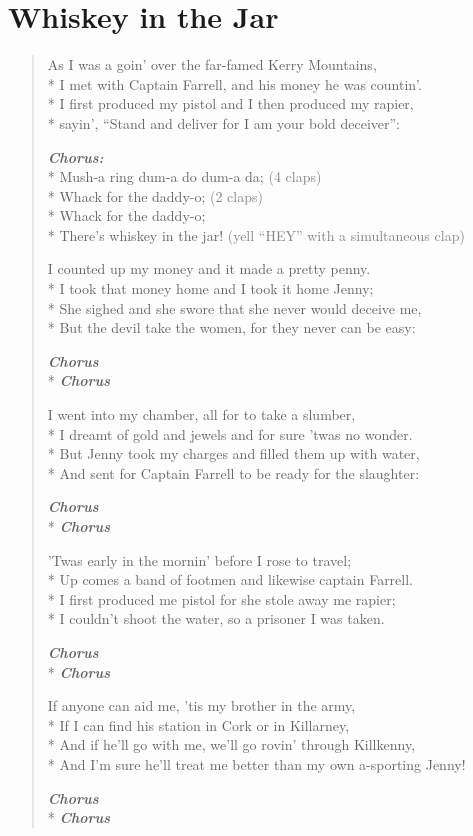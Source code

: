 \documentclass[9pt,twoside]{extarticle}
\makeatletter
\newenvironment{xverse}{
	\begin{verse}
	\fontsize{8.5}{10.5}\selectfont
}{
	\end{verse}
}
\newcommand{\chorusdef}{\textbf{\emph{Chorus:}}\\*}
\newcommand{\chorus@mark}[1][1]{%
\textbf{\emph{Chorus \ifthenelse{\equal{#1}{1}}{}{$\times$ #1}}}%
}
\newcommand{\chorusmark}[1][1]{%
\ifvmode%
\vspace{-0.5\stanzaskip}%
\chorus@mark[#1]%
\vspace{-0.5\stanzaskip}%
\else \\*%
\chorus@mark[#1]%
\fi%
}
\newcommand{\gray}[1]{\textcolor{gray}{#1}}
\makeatother
\begin{document}
\section{Whiskey in the Jar}

\begin{xverse}
As I was a goin’ over the far-famed Kerry Mountains, \\*
I met with Captain Farrell, and his money he was countin’. \\*
I first produced my pistol and I then produced my rapier, \\*
sayin’, “Stand and deliver for I am your bold deceiver”:

\chorusdef
Mush-a ring dum-a do dum-a da; \gray{(4 claps)} \\*
Whack for the daddy-o; \gray{(2 claps)} \\*
Whack for the daddy-o; \\*
There’s whiskey in the jar! \gray{(yell “HEY” with a simultaneous clap)}

I counted up my money and it made a pretty penny. \\*
I took that money home and I took it home Jenny; \\*
She sighed and she swore that she never would deceive me, \\*
But the devil take the women, for they never can be easy:

\chorusmark

I went into my chamber, all for to take a slumber, \\*
I dreamt of gold and jewels and for sure ’twas no wonder. \\*
But Jenny took my charges and filled them up with water, \\*
And sent for Captain Farrell to be ready for the slaughter:

\chorusmark

’Twas early in the mornin’ before I rose to travel; \\*
Up comes a band of footmen and likewise captain Farrell. \\*
I first produced me pistol for she stole away me rapier; \\*
I couldn’t shoot the water, so a prisoner I was taken.

\chorusmark

If anyone can aid me, ’tis my brother in the army, \\*
If I can find his station in Cork or in Killarney, \\*
And if he’ll go with me, we’ll go rovin’ through Killkenny, \\*
And I’m sure he’ll treat me better than my own a-sporting Jenny!

\chorusmark[2]
\end{xverse}
\end{document}
